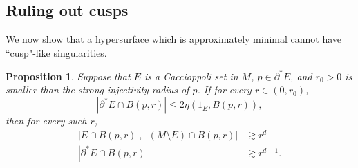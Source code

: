 \documentclass[reqno,12pt,letterpaper]{amsart}
\newtheorem{proposition}[theorem]{Proposition}
\theoremstyle{definition}
\numberwithin{equation}{section}
\begin{document}
\subsection{Ruling out cusps}
We now show that a hypersurface which is approximately minimal cannot have ``cusp"-like singularities.

\begin{proposition}\label{uniform density estimate}
Suppose that $E$ is a Caccioppoli set in $M$, $p \in \partial^* E$, and $r_0 > 0$ is smaller than the strong injectivity radius of $p$.
If for every $r \in (0, r_0)$,
\begin{equation}\label{density estimate hypothesis}
|\partial^* E \cap B(p, r)| \leq 2\eta(1_E, B(p, r)),
\end{equation}
then for every such $r$,
\begin{align*}|E \cap B(p, r)|, ~|(M \setminus E) \cap B(p, r)| &\gtrsim r^d\\
|\partial^* E \cap B(p, r)| &\gtrsim r^{d - 1}.\end{align*}
\end{proposition}
\end{document}
